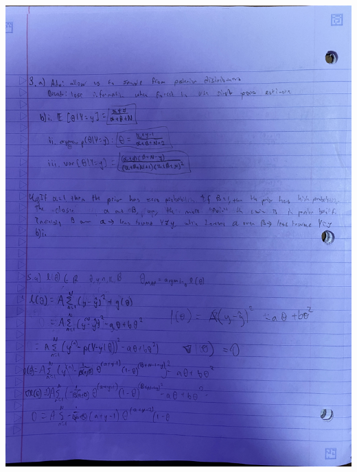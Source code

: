 \documentclass[submit]{harvardml}
\begin{document}
\begin{sol}{}
\begin{center}
    \includegraphics[angle=270,width=0.9\linewidth]{1img3.JPG}
  \end{center}
\end{sol}

\newpage

\end{document}
